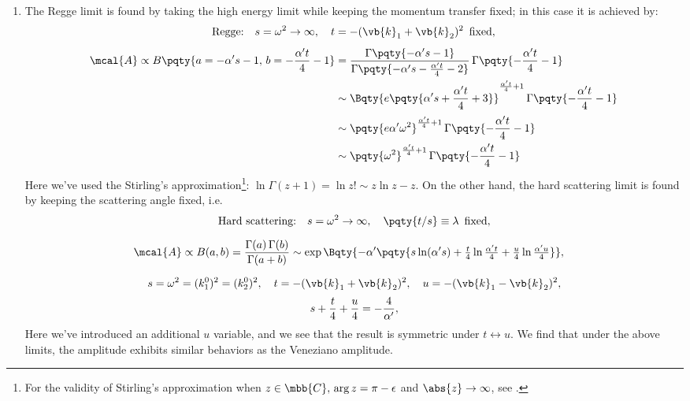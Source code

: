 \documentclass[a4paper,10pt]{article}
\begin{document}
\begin{enumerate}
\begin{enumerate}
	\item The Regge limit is found by taking the high energy limit while keeping the momentum transfer fixed; in this case it is achieved by:
	\begin{gather}
		\text{Regge:}\quad
			s = \omega^2 \to\infty,\quad
			t = - (\vb{k}_1 + \vb{k}_2)^2
				\,\ \text{fixed},
	\\[1ex]
	\begin{aligned}
		\mcal{A} \propto
			B\pqty{
				a = -\alpha's - 1,\,
				b = -\frac{\alpha't}{4} - 1
			}
		&= \frac{\Gamma\pqty{
				-\alpha's - 1
			}}{\Gamma\pqty{
				-\alpha's - \frac{\alpha't}{4} - 2
			}}\,
			\Gamma\pqty{-\frac{\alpha't}{4} - 1} \\
		&\sim \Bqty{
				e\pqty{
					\alpha's
					+ \frac{\alpha't}{4} + 3
				}
			}^{\frac{\alpha't}{4} + 1}\,
			\Gamma\pqty{-\frac{\alpha't}{4} - 1} \\[.5ex]
		&\sim \pqty{
				e\alpha'\omega^2
			}^{\frac{\alpha't}{4} + 1}\,
			\Gamma\pqty{-\frac{\alpha't}{4} - 1} \\
		&\sim \pqty{
				\omega^2
			}^{\frac{\alpha't}{4} + 1}\,
			\Gamma\pqty{-\frac{\alpha't}{4} - 1}
	\end{aligned}
	\end{gather}
	Here we've used the Stirling's approximation\footnote{
		For the validity of Stirling's approximation when $z\in\mbb{C},\,\arg z = \pi - \epsilon$ and $\abs{z}\to\infty$, see . 
	}: $
		\ln \Gamma(z + 1)
		= \ln z!
		\sim z\ln z - z
	$. On the other hand, the hard scattering limit is found by keeping the scattering angle fixed, i.e.
	\begin{gather}
		\text{Hard scattering:}\quad
			s = \omega^2 \to\infty,\quad
			\pqty{t/s} \equiv \lambda\,\ \text{fixed},
	\\[1.5ex]
	\begin{aligned}
		\mcal{A}
		\propto B(a,b)
		= \frac{\Gamma(a)\,\Gamma(b)}{
				\Gamma(a+b)
			}
		&\sim \exp\Bqty{
				-\alpha'\pqty{
					s\ln (\alpha's)
					+ \tfrac{t}{4} \ln \tfrac{\alpha't}{4}
					+ \tfrac{u}{4} \ln \tfrac{\alpha'u}{4}
				}
			},
	\end{aligned}
	\\[1.5ex]
		s = \omega^2 = (k_1^0)^2 = (k_2^0)^2,\quad
		t = - (\vb{k}_1 + \vb{k}_2)^2,\quad
		u = - (\vb{k}_1 - \vb{k}_2)^2,
	\\[.5ex]
		s + \frac{t}{4} + \frac{u}{4} = - \frac{4}{\alpha'},
	\end{gather}
	Here we've introduced an additional $u$ variable, and we see that the result is symmetric under $
		t\leftrightarrow u
	$. We find that under the above limits, the amplitude exhibits similar behaviors as the Veneziano amplitude. 
	

\end{enumerate}
\end{enumerate}
\end{document}
